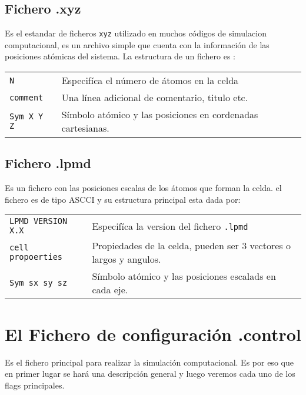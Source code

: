\documentclass[a4paper,10pt]{scrbook}
\begin{document}
\subsection{Fichero .xyz}

Es el estandar de ficheros \verb|xyz| utilizado en muchos c\'odigos de simulacion computacional, es un archivo simple que cuenta con la informaci\'on de las posiciones at\'omicas del sistema. La estructura de un fichero es :
\begin{center}
\begin{tabular}{l|l}
 \verb|N| & Especif\'ica el n\'umero de \'atomos en la celda \\
 \verb|comment| & Una l\'inea adicional de comentario, titulo etc. \\
 \verb|Sym X Y Z| & S\'imbolo at\'omico y las posiciones en cordenadas cartesianas. \\
\end{tabular}
\end{center}

\subsection{Fichero .lpmd}

Es un fichero con las posiciones escalas de los \'atomos que forman la celda. el fichero es de tipo ASCCI y su estructura principal esta dada por:

\begin{center}
 \begin{tabular}{l|l}
 \verb|LPMD VERSION X.X | & Especif\'ica la version del fichero \verb|.lpmd| \\
 \verb|cell propoerties | & Propiedades de la celda, pueden ser 3 vectores o largos y angulos. \\
 \verb|Sym sx sy sz| & S\'imbolo at\'omico y las posiciones escalads en cada eje.\\
\end{tabular}

\end{center}


\section{El Fichero de configuraci\'on .control}

Es el fichero principal para realizar la simulaci\'on computacional. Es por eso que en primer lugar se har\'a una descripci\'on general y luego veremos cada uno de los flags principales.
\end{document}
